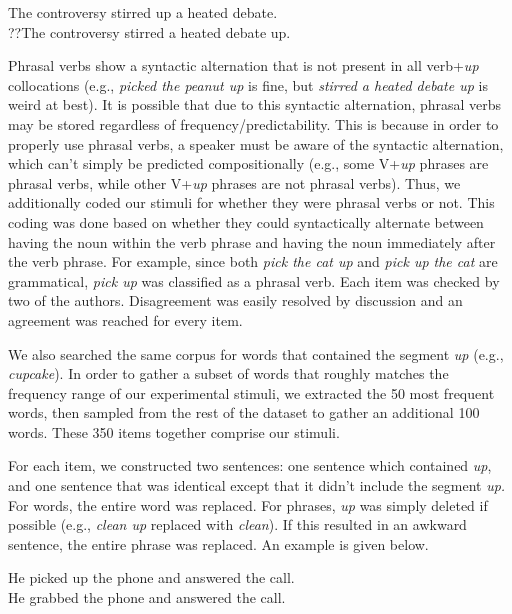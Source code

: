 \documentclass[
  authoryear,
  preprint,
  1p,
  onecolumn]{elsarticle}
\begin{document}
\begin{exe} 
\ex
  \begin{xlist}
    \ex The controversy stirred up a heated debate. \\
    \ex ??The controversy stirred a heated debate up. \\
  \end{xlist}
\end{exe}

Phrasal verbs show a syntactic alternation that is not present in all
verb+\emph{up} collocations (e.g., \emph{picked the peanut up} is fine,
but \emph{stirred a heated debate up} is weird at best). It is possible
that due to this syntactic alternation, phrasal verbs may be stored
regardless of frequency/predictability. This is because in order to
properly use phrasal verbs, a speaker must be aware of the syntactic
alternation, which can't simply be predicted compositionally (e.g., some
V+\emph{up} phrases are phrasal verbs, while other V+\emph{up} phrases
are not phrasal verbs). Thus, we additionally coded our stimuli for
whether they were phrasal verbs or not. This coding was done based on
whether they could syntactically alternate between having the noun
within the verb phrase and having the noun immediately after the verb
phrase. For example, since both \emph{pick the cat up} and \emph{pick up
the cat} are grammatical, \emph{pick up} was classified as a phrasal
verb. Each item was checked by two of the authors. Disagreement was
easily resolved by discussion and an agreement was reached for every
item.

We also searched the same corpus for words that contained the segment
\emph{up} (e.g., \emph{cupcake}). In order to gather a subset of words
that roughly matches the frequency range of our experimental stimuli, we
extracted the 50 most frequent words, then sampled from the rest of the
dataset to gather an additional 100 words. These 350 items together
comprise our stimuli.

For each item, we constructed two sentences: one sentence which
contained \emph{up}, and one sentence that was identical except that it
didn't include the segment \emph{up.} For words, the entire word was
replaced. For phrases, \emph{up} was simply deleted if possible (e.g.,
\emph{clean up} replaced with \emph{clean}). If this resulted in an
awkward sentence, the entire phrase was replaced. An example is given
below.

\begin{exe} 
\ex
  \begin{xlist}
    \ex He picked up the phone and answered the call. \\
    \ex He grabbed the phone and answered the call. \\
  \end{xlist}
\end{exe}
\end{document}
